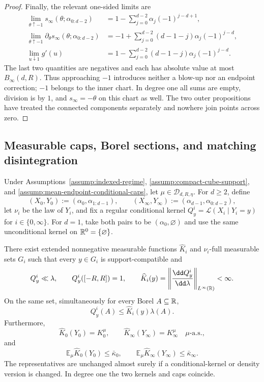 \begin{proof}
Finally, the relevant one-sided limits are
\[
\begin{aligned}
\lim_{\theta\uparrow-1}s_\infty(\theta;\alpha_{0:d-2})
&=1-\sum_{j=0}^{d-2}\alpha_j(-1)^{j-d+1},\\
\lim_{\theta\uparrow-1}\partial_\theta s_\infty(\theta;\alpha_{0:d-2})
&=-1+\sum_{j=0}^{d-2}(d-1-j)\alpha_j(-1)^{j-d},\\
\lim_{u\downarrow1}g'(u)
&=1-\sum_{j=0}^{d-2}(d-1-j)\alpha_j(-1)^{j-d}.
\end{aligned}
\]
The last two quantities are negatives and each has absolute value at most
$B_\infty(d,R)$.  Thus approaching $-1$ introduces neither a blow-up nor an
endpoint correction; $-1$ belongs to the inner chart.  In degree one all
sums are empty, division is by $1$, and $s_\infty=-\theta$ on this chart as
well.  The two outer propositions have treated the connected components
separately and nowhere join points across zero.
\end{proof}

\subsection{Measurable caps, Borel sections, and matching disintegration}
\label{app:disintegration}

\begin{lemma}
\label{lem:kernel-caps}
Under Assumptions~\ref{assump:indexed-regime},
\ref{assump:compact-cube-support}, and
\ref{assump:mean-endpoint-conditional-caps}, let
$\mu\in\mathcal D_{d,R,\eta}$.  For $d\geq2$, define
\[
(X_0,Y_0):=(\alpha_0,\alpha_{1:d-1}),\qquad
(X_\infty,Y_\infty):=(\alpha_{d-1},\alpha_{0:d-2}),
\]
let $\nu_i$ be the law of $Y_i$, and fix a regular conditional kernel
$Q^i_y=\mathcal L(X_i\mid Y_i=y)$ for $i\in\{0,\infty\}$.  For $d=1$,
take both pairs to be $(\alpha_0,\varnothing)$ and use the same unconditional
kernel on $\mathbb{R}^0=\{\varnothing\}$.

There exist extended nonnegative measurable functions $\widehat K_i$ and
$\nu_i$-full measurable sets $G_i$ such that every $y\in G_i$ is
support-compatible and
\[
Q^i_y\ll\lambda,\qquad Q^i_y([-R,R])=1,\qquad
\widehat K_i(y)=\left\|\frac{\dd Q^i_y}{\dd\lambda}\right\|_{L^\infty(\R)}
<\infty.
\]
On the same set, simultaneously for every Borel $A\subseteq\mathbb{R}$,
\begin{equation}
Q^i_y(A)\leq\widehat K_i(y)\lambda(A).
\label{eq:kernel-domination}
\end{equation}
Furthermore,
\begin{equation}
\widehat K_0(Y_0)=K_0^\mu,\qquad
\widehat K_\infty(Y_\infty)=K_\infty^\mu
\quad\mu\text{-a.s.},
\label{eq:cap-identities}
\end{equation}
and
\begin{equation}
\mathbb E_\mu\widehat K_0(Y_0)\leq\bar\kappa_0,
\qquad
\mathbb E_\mu\widehat K_\infty(Y_\infty)\leq\bar\kappa_\infty.
\label{eq:mean-cap-bounds}
\end{equation}
The representatives are unchanged almost surely if a conditional-kernel or
density version is changed.  In degree one the two kernels and caps coincide.
\end{lemma}

